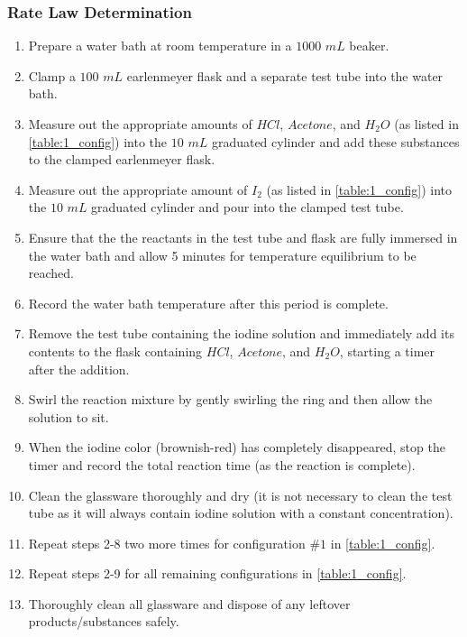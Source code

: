 \subsubsection{Rate Law Determination}
	\begin{enumerate}[]
	  \item Prepare a water bath at room temperature in a $1000$ $mL$ beaker.
	  \item Clamp a $100$ $mL$ earlenmeyer flask and a separate test tube into the water bath.
	  \item Measure out the appropriate amounts of $HCl$, $Acetone$, and $H_2O$ (as listed in \cref{table:1_config}) into the $10$ $mL$ graduated cylinder and add these substances to the clamped earlenmeyer flask.
	  \item Measure out the appropriate amount of $I_2$ (as listed in \cref{table:1_config}) into the $10$ $mL$ graduated cylinder and pour into the clamped test tube.
	  \item Ensure that the the reactants in the test tube and flask are fully immersed in the water bath and allow 5 minutes for temperature equilibrium to be reached.
	  \item Record the water bath temperature after this period is complete.
	  \item Remove the test tube containing the iodine solution and immediately add its contents to the flask containing $HCl$, $Acetone$, and $H_2O$, starting a timer after the addition.
	  \item Swirl the reaction mixture by gently swirling the ring and then allow the solution to sit.
	  \item When the iodine color (brownish-red) has completely disappeared, stop the timer and record the total reaction time (as the reaction is complete).
	  \item Clean the glassware thoroughly and dry (it is not necessary to clean the test tube as it will always contain iodine solution with a constant concentration).
	  \item Repeat steps 2-8 two more times for configuration $\#1$ in \cref{table:1_config}.
	  \item Repeat steps 2-9 for all remaining configurations in \cref{table:1_config}.
	  \item Thoroughly clean all glassware and dispose of any leftover products/substances safely.
	\end{enumerate}

